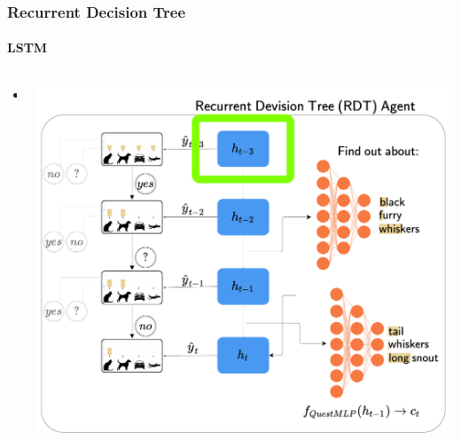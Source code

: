 \documentclass[9pt]{beamer}
\begin{document}
\begin{frame}
\frametitle{Recurrent Decision Tree}
\framesubtitle{LSTM}
\begin{columns}[T]
	\begin{column}{.5\textwidth}
		\begin{itemize}
			\item
		\end{itemize}
	\end{column}
	\begin{column}{.5\textwidth}
			\includegraphics[width=\textwidth]{images/urdtc_parts_lstm.pdf}
	\end{column}
\end{columns}
\end{frame}
\end{document}
